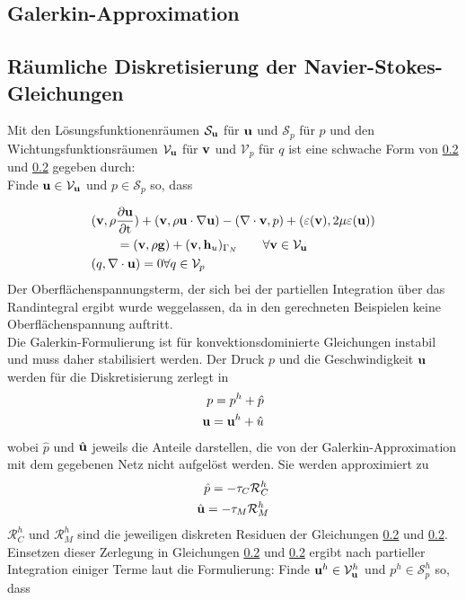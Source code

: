 \subsection{Galerkin-Approximation}

\subsection{Räumliche Diskretisierung der Navier-Stokes-Gleichungen}
Mit den Lösungsfunktionenräumen 
\(\mathcal{S}_{\mathbf{u}}\) 
für \(\mathbf{u}\) 
und \(\mathcal{S}_p\) 
für \(p\)
und den Wichtungsfunktionsräumen \(\mathcal{V}_{\mathbf{u}}\) 
für \(\mathbf{v}\) 
und \(\mathcal{V}_p\) 
für \(q\) 
ist eine schwache Form von \ref{} und \ref{} gegeben durch:\\ 

Finde \(\mathbf{u} \in \mathcal{V}_{\mathbf{u}}\) 
und \(p \in \mathcal{S}_p\) 
so, dass

\begin{align}
& (\vect{v},\rho\partt{\vect{u}}) + (\vect{v},\rho\vect{u}\cdot\nabla\vect{u})-(\nabla\cdot\vect{v},p) + (\varepsilon(\vect{v}),2\mu\varepsilon(\vect{u})) \nonumber\\
& \qquad = (\vect{v},\rho\vect{g}) + (\vect{v},\vect{h}_u)_{\Gamma_N} %
\qquad \forall \vect{v} \in \mathcal{V}_{\vect{u}} \\
&(q,\nabla\cdot\vect{u}) = 0 \forall q \in \mathcal{V}_p
\end{align}
Der Oberflächenspannungsterm, der sich bei der partiellen Integration über das Randintegral ergibt wurde weggelassen, da in den gerechneten Beispielen keine Oberflächenspannung auftritt.\\

Die Galerkin-Formulierung ist für konvektionsdominierte Gleichungen instabil und muss daher stabilisiert werden. Der Druck $p$ und die Geschwindigkeit $\mathbf{u}$ werden für die Diskretisierung zerlegt in 
\begin{align}
 p = p^h + \hat{p} \\
 \mathbf{u} = \mathbf{u}^h + \hat{u}
\end{align}
wobei $\hat{p}$ und $\hat{\mathbf{u}}$ jeweils die Anteile darstellen, die von der Galerkin-Approximation mit dem gegebenen Netz nicht aufgelöst werden. Sie werden approximiert zu
\begin{align}
 \hat{p} = -\tau_C\mathcal{R}^h_C \\
 \hat{\mathbf{u}} = -\tau_M\mathcal{R}^h_M
\end{align}
$\mathcal{R}^h_C$ und $\mathcal{R}^h_M$ sind die jeweiligen diskreten Residuen der Gleichungen \ref{} und \ref{}. Einsetzen dieser Zerlegung in Gleichungen \ref{} und \ref{} ergibt nach partieller Integration einiger Terme laut \cite{rasthofer} die Formulierung: Finde \(\mathbf{u}^h \in \mathcal{V}^h_{\mathbf{u}}\) 
und \(p^h \in \mathcal{S}^h_p\) 
so, dass

